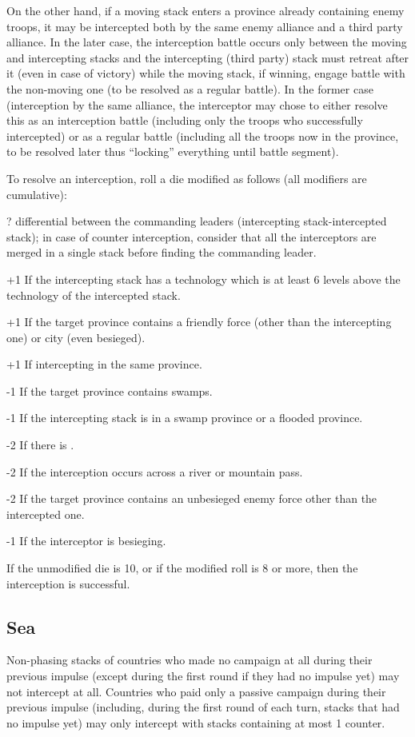 On the other hand, if a moving stack enters a province already containing
enemy troops, it may be intercepted both by the same enemy alliance and a
third party alliance. In the later case, the interception battle occurs only
between the moving and intercepting stacks and the intercepting (third party)
stack must retreat after it (even in case of victory) while the moving stack,
if winning, engage battle with the non-moving one (to be resolved as a regular
battle). In the former case (interception by the same alliance, the
interceptor may chose to either resolve this as an interception battle
(including only the troops who successfully intercepted) or as a regular
battle (including all the troops now in the province, to be resolved later
thus ``locking'' everything until battle segment).

To resolve an interception, roll a die modified as follows (all modifiers are
cumulative):
\begin{modlist}
\item[\textplusminus?] \Man differential between the commanding leaders
  (intercepting stack-intercepted stack); in case of counter interception,
  consider that all the interceptors are merged in a single stack before
  finding the commanding leader.
\item[+1] If the intercepting stack has a technology which is at least 6
  levels above the technology of the intercepted stack.
\item[+1] If the target province contains a friendly force (other than the
  intercepting one) or city (even besieged).
\item[+1] If intercepting in the same province.
\item[-1] If the target province contains swamps.
\item[-1] If the intercepting stack is in a swamp province or a flooded
  province.
\item[-2] If there is .
\item[-2] If the interception occurs across a river or mountain pass.
\item[-2] If the target province contains an unbesieged enemy force other than
  the intercepted one.
\item[-1] If the interceptor is besieging.
\end{modlist}

If the unmodified die is 10, or if the modified roll is 8 or more, then the
interception is successful.

\subsection{Sea}
Non-phasing stacks of countries who made no campaign at all during their
previous impulse (except during the first round if they had no impulse yet)
may not intercept at all. Countries who paid only a passive campaign during
their previous impulse (including, during the first round of each turn, stacks
that had no impulse yet) may only intercept with stacks containing at most 1
\FLEET counter.

